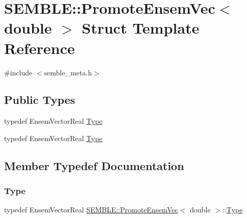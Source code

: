 \hypertarget{structSEMBLE_1_1PromoteEnsemVec_3_01double_01_4}{}\section{S\+E\+M\+B\+LE\+:\+:Promote\+Ensem\+Vec$<$ double $>$ Struct Template Reference}
\label{structSEMBLE_1_1PromoteEnsemVec_3_01double_01_4}


{\ttfamily \#include $<$semble\+\_\+meta.\+h$>$}

\subsection*{Public Types}
\begin{DoxyCompactItemize}
\item 
typedef Ensem\+Vector\+Real \mbox{\hyperlink{structSEMBLE_1_1PromoteEnsemVec_3_01double_01_4_a5dc432f418f98544267b5392b92ce102}{Type}}
\item 
typedef Ensem\+Vector\+Real \mbox{\hyperlink{structSEMBLE_1_1PromoteEnsemVec_3_01double_01_4_a5dc432f418f98544267b5392b92ce102}{Type}}
\end{DoxyCompactItemize}


\subsection{Member Typedef Documentation}
\mbox{\label{structSEMBLE_1_1PromoteEnsemVec_3_01double_01_4_a5dc432f418f98544267b5392b92ce102}} 
\subsubsection{\texorpdfstring{Type}{Type}\hspace{0.1cm}{\footnotesize\ttfamily [1/2]}}
{\footnotesize\ttfamily typedef Ensem\+Vector\+Real \mbox{\hyperlink{structSEMBLE_1_1PromoteEnsemVec}{S\+E\+M\+B\+L\+E\+::\+Promote\+Ensem\+Vec}}$<$ double $>$\+::\mbox{\hyperlink{structSEMBLE_1_1PromoteEnsemVec_3_01double_01_4_a5dc432f418f98544267b5392b92ce102}{Type}}}

\mbox{\label{structSEMBLE_1_1PromoteEnsemVec_3_01double_01_4_a5dc432f418f98544267b5392b92ce102}} 
